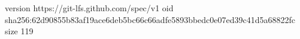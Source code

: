 version https://git-lfs.github.com/spec/v1
oid sha256:62d90855b83af19ace6deb5bc66c66adfe5893bbedc0e07ed39c41d5a68822fc
size 119
